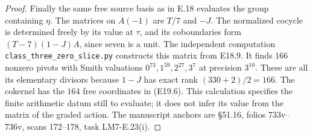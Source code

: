 \begin{proof}
Finally the same free source basis as in
E.18 evaluates the group containing $\eta$.
The matrices on $A(-1)$ are $T/7$ and
$-J$. The normalized cocycle is determined
freely by its value at $\tau$, and its
coboundaries form
$(T-7)(1-J)A$, since seven is a unit.
The independent computation
\texttt{class\_three\_zero\_slice.py}
constructs this matrix from E18.9. It finds
$166$ nonzero pivots with Smith valuations
$0^{73},1^{59},2^{27},3^7$ at precision
$3^{10}$. These are all its elementary
divisors because $1-J$ has exact rank
$(330+2)/2=166$. The cokernel has the
$164$ free coordinates in (E19.6).
This calculation specifies the finite
arithmetic datum still to evaluate; it
does not infer its value from the matrix
of the graded action. The manuscript
anchors are \S51.16, folios 733v--736v,
scans 172--178, task LM7-E.23(i).
\end{proof}

